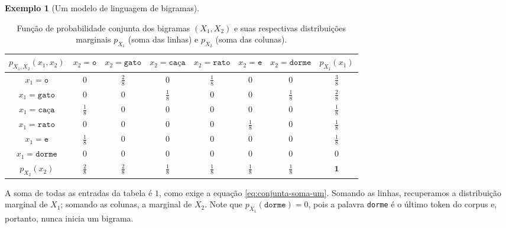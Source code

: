 \documentclass[12pt,portuguese]{article}
\theoremstyle{definition}
\newtheorem{example}[example]{Exemplo}
\begin{document}
\begin{example}[Um modelo de linguagem de bigramas]
\begin{table}[H]
\begin{tabular}{ccccccc|c}
\toprule
$p_{X_1,X_2}(x_1,x_2)$ & $x_2=\texttt{o}$ & $x_2=\texttt{gato}$ & $x_2=\texttt{caça}$ & $x_2=\texttt{rato}$ & $x_2=\texttt{e}$ & $x_2=\texttt{dorme}$ & $p_{X_1}(x_1)$ 
\\[0.2cm]
\midrule
$x_1=\texttt{o}$     & $0$           & $\tfrac{2}{8}$ & $0$           & $\tfrac{1}{8}$ & $0$           & $0$           & $\tfrac{3}{8}$ 
\\[0.5cm]
$x_1=\texttt{gato}$  & $0$           & $0$           & $\tfrac{1}{8}$ & $0$           & $0$           & $\tfrac{1}{8}$ & $\tfrac{2}{8}$ 
\\[0.5cm]
$x_1=\texttt{caça}$  & $\tfrac{1}{8}$ & $0$           & $0$           & $0$           & $0$           & $0$           & $\tfrac{1}{8}$ 
\\[0.5cm]
$x_1=\texttt{rato}$  & $0$           & $0$           & $0$           & $0$           & $\tfrac{1}{8}$ & $0$           & $\tfrac{1}{8}$ 
\\[0.5cm]
$x_1=\texttt{e}$     & $\tfrac{1}{8}$ & $0$           & $0$           & $0$           & $0$           & $0$           & $\tfrac{1}{8}$ 
\\[0.5cm]
$x_1=\texttt{dorme}$ & $0$           & $0$           & $0$           & $0$           & $0$           & $0$           & $0$            
\\[0.5cm]
\midrule
$p_{X_2}(x_2)$       & $\tfrac{2}{8}$ & $\tfrac{2}{8}$ & $\tfrac{1}{8}$ & $\tfrac{1}{8}$ & $\tfrac{1}{8}$ & $\tfrac{1}{8}$ & $\mathbf{1}$   
\\[0.2cm]
\bottomrule
\end{tabular}
\vspace{0.25cm}
\caption{Função de probabilidade conjunta dos bigramas $(X_1,X_2)$ e suas respectivas distribuições marginais $p_{X_1}$ (soma das linhas) e $p_{X_2}$ (soma das colunas).}
\label{tab:bigramas}
\end{table}

A soma de todas as entradas da tabela é $1$, como exige a equação
\eqref{eq:conjunta-soma-um}. Somando as linhas, recuperamos a distribuição
marginal de $X_1$; somando as colunas, a marginal de $X_2$. Note que
$p_{X_1}(\texttt{dorme})=0$, pois a palavra \texttt{dorme} é o último token do
corpus e, portanto, nunca inicia um bigrama.


\end{example}
\end{document}
